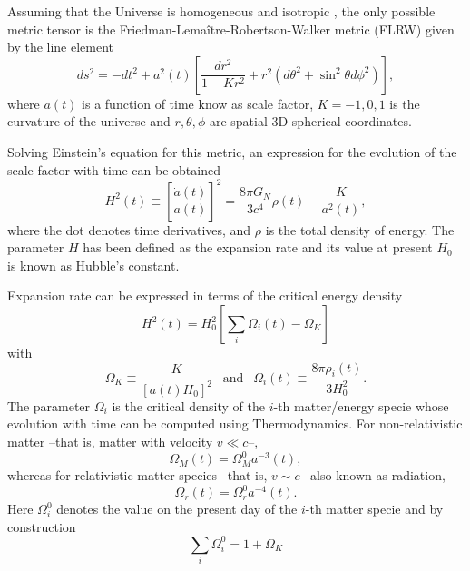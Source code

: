 Assuming that the Universe is homogeneous and isotropic \citep{2014MNRAS.440...10A,2015MNRAS.449..670A}, the only possible metric tensor is the Friedman-Lema\^itre-Robertson-Walker metric (FLRW) given by the line element \cite{1927ASSB...47...49L}
\begin{equation}
ds^2 = -dt^2+a^2(t)\left[\frac{dr^2}{1-Kr^2}+r^2(d\theta^2+\sin^2\theta d\phi^2)\right],
\end{equation}
where $a(t)$ is a function of time know as scale factor, $K=-1,0,1$ is the curvature of the universe and $r,\theta,\phi$ are spatial 3D spherical coordinates.
\newline

Solving Einstein's equation for this metric, an expression for the evolution of the scale factor with time can be obtained
\begin{equation}
H^2(t)\equiv \left[\frac{\dot a(t)}{a(t)}\right]^2 = \frac{8\pi G_N}{3c^4}\rho(t) -\frac{K}{a^2(t)},
\end{equation}
where the dot denotes time derivatives, and $\rho$ is the total density of energy. The parameter $H$ has been defined as the expansion rate and its value at present $H_0$ is known as Hubble's constant.
\newline

Expansion rate can be expressed in terms of the critical energy density
\begin{equation}
H^2(t) = H_0^2\left[\sum_i\Omega_i(t)-\Omega_K\right]
\label{eq:flrw}
\end{equation}
with
\begin{equation}
\Omega_K\equiv\frac{K}{[a(t)H_0]^2}\ \ \mbox{ and }\ \ \Omega_i(t)\equiv \frac{8\pi\rho_i(t)}{3H_0^2}.
\end{equation}
The parameter $\Omega_i$ is the critical density of the $i$-th matter/energy specie whose evolution with time can be computed using Thermodynamics. For non-relativistic matter --that is, matter with velocity $v\ll c$--, 
\begin{equation}
\Omega_M(t) = \Omega_M^0a^{-3}(t),
\end{equation}
whereas for relativistic matter species --that is, $v\sim c$-- also known as radiation,
\begin{equation}
\Omega_r(t) = \Omega_r^0 a^{-4}(t).
\end{equation}
Here $\Omega_i^0$ denotes the value on the present day of the $i$-th matter specie and by construction
\begin{equation}
\sum_i\Omega_i^0=1+\Omega_K
\label{eq:conservationenergy}
\end{equation}
\newline

